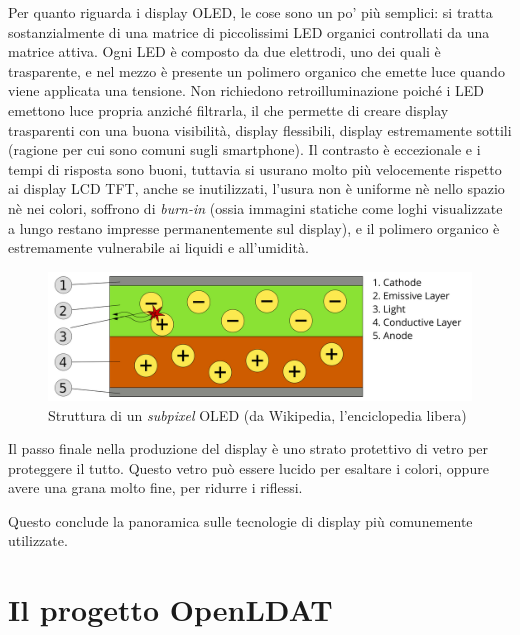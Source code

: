 Per quanto riguarda i display OLED, le cose sono un po' più semplici: si tratta sostanzialmente di una matrice di piccolissimi LED organici controllati da una matrice attiva\cite{amoled1}. Ogni LED è composto da due elettrodi, uno dei quali è trasparente, e nel mezzo è presente un polimero organico che emette luce quando viene applicata una tensione. Non richiedono retroilluminazione poiché i LED emettono luce propria anziché filtrarla, il che permette di creare display trasparenti con una buona visibilità, display flessibili\cite{flexibleoleds}, display estremamente sottili (ragione per cui sono comuni sugli smartphone). Il contrasto è eccezionale e i tempi di risposta sono buoni, tuttavia si usurano molto più velocemente rispetto ai display LCD TFT, anche se inutilizzati, l'usura non è uniforme nè nello spazio nè nei colori, soffrono di \textit{burn-in} (ossia immagini statiche come loghi visualizzate a lungo restano impresse permanentemente sul display), e il polimero organico è estremamente vulnerabile ai liquidi e all'umidità.

\begin{figure}[h]
	\centering
	\includegraphics[width=\textwidth]{Introduzione_files/oled.png}
	\caption{Struttura di un \textit{subpixel} OLED (da Wikipedia, l'enciclopedia libera)}
	\label{fig:oled}
\end{figure}

Il passo finale nella produzione del display è uno strato protettivo di vetro per proteggere il tutto. Questo vetro può essere lucido per esaltare i colori, oppure avere una grana molto fine, per ridurre i riflessi.

Questo conclude la panoramica sulle tecnologie di display più comunemente utilizzate.

\section{Il progetto OpenLDAT}
